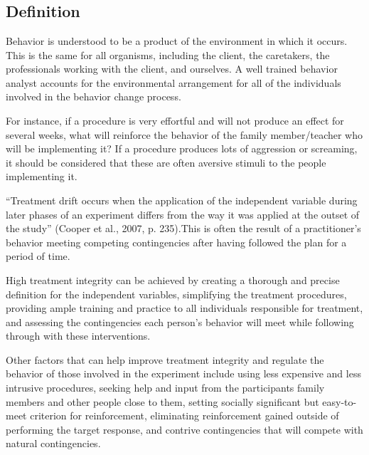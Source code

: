 \clearpage \section[\fourkTwo{}]{\fourkTwo{}%
              }
\subsection{Definition}
Behavior is understood to be a product of the environment in which it occurs. This is the same for all organisms, including the client, the caretakers, the professionals working with the client, and ourselves. A well trained behavior analyst accounts for the environmental arrangement for all of the individuals involved in the behavior change process. 

For instance, if a procedure is very effortful and will not produce an effect for several weeks, what will reinforce the behavior of the family member/teacher who will be implementing it? If a procedure produces lots of aggression or screaming, it should be considered that these are often aversive stimuli to the people implementing it.

``Treatment drift occurs when the application of the independent variable during later phases of an experiment differs from the way it was applied at the outset of the study'' (Cooper et al., 2007, p. 235).This is often the result of a practitioner's behavior meeting competing contingencies after having followed the plan for a period of time.

High treatment integrity can be achieved by creating a thorough and precise definition for the independent variables, simplifying the treatment procedures, providing ample training and practice to all individuals responsible for treatment, and assessing the contingencies each person's behavior will meet while following through with these interventions. 

Other factors that can help improve treatment integrity and regulate the behavior of those involved in the experiment include using less expensive and less intrusive procedures, seeking help and input from the participants family members and other people close to them, setting socially significant but easy-to-meet criterion for reinforcement, eliminating reinforcement gained outside of performing the target response, and contrive contingencies that will compete with natural contingencies. 
%

